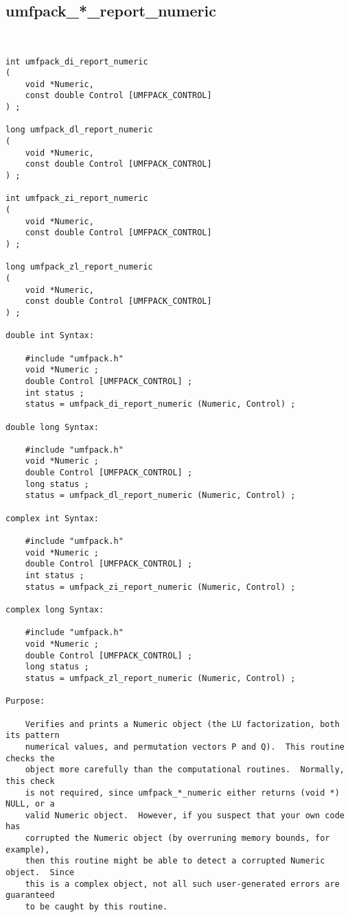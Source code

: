 \newpage
\subsection{umfpack\_*\_report\_numeric}

{\footnotesize
\begin{verbatim}


int umfpack_di_report_numeric
(
    void *Numeric,
    const double Control [UMFPACK_CONTROL]
) ;

long umfpack_dl_report_numeric
(
    void *Numeric,
    const double Control [UMFPACK_CONTROL]
) ;

int umfpack_zi_report_numeric
(
    void *Numeric,
    const double Control [UMFPACK_CONTROL]
) ;

long umfpack_zl_report_numeric
(
    void *Numeric,
    const double Control [UMFPACK_CONTROL]
) ;

double int Syntax:

    #include "umfpack.h"
    void *Numeric ;
    double Control [UMFPACK_CONTROL] ;
    int status ;
    status = umfpack_di_report_numeric (Numeric, Control) ;

double long Syntax:

    #include "umfpack.h"
    void *Numeric ;
    double Control [UMFPACK_CONTROL] ;
    long status ;
    status = umfpack_dl_report_numeric (Numeric, Control) ;

complex int Syntax:

    #include "umfpack.h"
    void *Numeric ;
    double Control [UMFPACK_CONTROL] ;
    int status ;
    status = umfpack_zi_report_numeric (Numeric, Control) ;

complex long Syntax:

    #include "umfpack.h"
    void *Numeric ;
    double Control [UMFPACK_CONTROL] ;
    long status ;
    status = umfpack_zl_report_numeric (Numeric, Control) ;

Purpose:

    Verifies and prints a Numeric object (the LU factorization, both its pattern
    numerical values, and permutation vectors P and Q).  This routine checks the
    object more carefully than the computational routines.  Normally, this check
    is not required, since umfpack_*_numeric either returns (void *) NULL, or a
    valid Numeric object.  However, if you suspect that your own code has
    corrupted the Numeric object (by overruning memory bounds, for example),
    then this routine might be able to detect a corrupted Numeric object.  Since
    this is a complex object, not all such user-generated errors are guaranteed
    to be caught by this routine.


\end{verbatim}}
